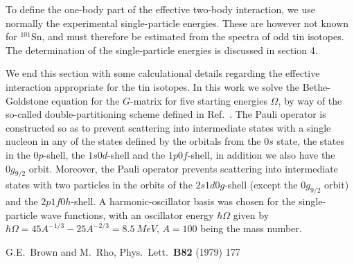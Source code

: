 To define the one-body part of the
effective two-body interaction, we use normally the experimental
single-particle energies. These are however not known for $^{101}$Sn, 
and must therefore be estimated from the spectra of odd tin isotopes.
The determination of the single-particle energies is discussed 
in section 4.

We end this section with some calculational details regarding
the effective interaction appropriate for the tin isotopes.
In this work we solve the Bethe-Goldstone equation for the $G$-matrix 
for five starting
energies $\Omega$, by way of the so-called double-partitioning scheme
defined in Ref.\ \cite{kkko76}. The Pauli operator is constructed so as to
prevent scattering into intermediate states with a single
nucleon in any of the
states defined by the orbitals from the $0s$ state, the states 
in the $0p$-shell, the 
$1s0d$-shell and the $1p0f$-shell, in addition we also have the $0g_{9/2}$
orbit. Moreover, the Pauli operator prevents scattering into intermediate
states with two particles in the orbits of the $2s1d0g$-shell (except the $0g_{9/2}$
orbit) and the $2p1f0h$-shell.
A harmonic-oscillator basis was chosen for the
single-particle wave functions, with an oscillator energy $\hbar\Omega$ given
by
$\hbar\Omega = 45A^{-1/3} - 25A^{-2/3}= 8.5~MeV$,  $A=100$ being the mass
number.





 G.E.\ Brown and M.\ Rho, Phys.\ Lett.\ {\bf B82} (1979) 177

